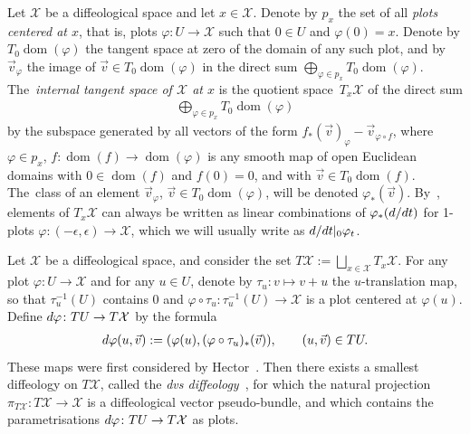 \documentclass[11pt]{article}
\numberwithin{equation}{section}
\numberwithin{equation}{section}
\def\dom{\operatorname{dom}}
\def\XX{{\mathcal{X}}}
\begin{document}
\begin{Definition}\label{tangentbundle}
Let $\XX$ be a diffeological space and let $x\in \XX$. Denote by $p_{x}$ the set of all \textit{plots centered at $x$}, that is, plots $\varphi\colon U\rightarrow \XX$ such that $0\in U$ and $\varphi(0) = x$. Denote by $T_{0}\dom(\varphi)$ the tangent space at zero of the domain of any such plot, and by $\vec{v}_{\varphi}$ the image of $\vec{v}\in T_{0}\dom(\varphi)$ in the direct sum $\bigoplus_{\varphi\in p_{x}}T_{0}\dom(\varphi)$. The~\textit{internal tangent space of $\XX$ at $x$} is the quotient space~$T_{x}\XX$ of the direct sum
\begin{gather*}
\bigoplus_{\varphi\in p_{x}} T_{0}\dom(\varphi)
\end{gather*}
by the subspace generated by all vectors of the form $f_{*}(\vec{v})_{\varphi} - \vec{v}_{\varphi\circ f}$, where $\varphi\in p_{x}$, $f\colon \dom(f)\rightarrow\dom(\varphi)$ is any smooth map of open Euclidean domains with $0\in\dom(f)$ and $f(0) = 0$, and with $\vec{v}\in T_{0}\dom(f)$. The~class of an element $\vec{v}_{\varphi}$, $\vec{v}\in T_{0}\dom(\varphi)$, will be denoted $\varphi_{*}(\vec{v})$. By~\cite[Proposition~3.3]{cw}, elements of $T_{x}\XX$ can always be written as linear combinations of $\varphi_{*}({\rm d}/{\rm d}t)$ for 1-plots $\varphi\colon (-\epsilon,\epsilon)\rightarrow\XX$, which we will usually write as ${\rm d}/{\rm d}t|_{0}\varphi_{t}$.
\end{Definition}

Let $\XX$ be a diffeological space, and consider the set $T\XX:=\bigsqcup_{x\in \XX}T_{x}\XX$. For any plot \mbox{$\varphi\colon U\rightarrow \XX$} and for any $u\in U$, denote by $\tau_{u}\colon v\mapsto v+u$ the $u$-translation map, so that $\tau_{u}^{-1}(U)$ contains $0$ and $\varphi\circ\tau_{u}\colon \tau_{u}^{-1}(U)\rightarrow \XX$ is a plot centered at $\varphi(u)$. Define ${\rm d}\varphi\colon TU\rightarrow T\XX$ by the formula
\begin{gather*}
{\rm d}\varphi(u,\vec{v}):=(\varphi(u),(\varphi\circ\tau_{u})_{*}(\vec{v})),\qquad (u,\vec{v})\in TU.
\end{gather*}
These maps were first considered by Hector~\cite{hector}. Then there exists a smallest diffeology on $T\XX$, called the \textit{dvs diffeology}~\cite{cw}, for which the natural projection $\pi_{T\XX}\colon T\XX\rightarrow \XX$ is a diffeological vector pseudo-bundle, and which contains the parametrisations ${\rm d}\varphi\colon TU\rightarrow T\XX$ as plots.
\end{document}
